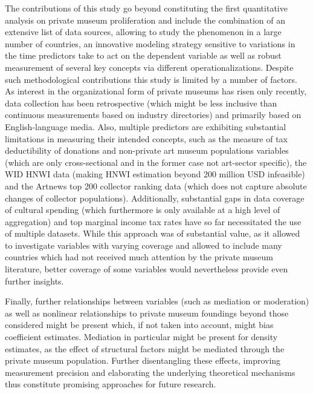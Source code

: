 \documentclass[11pt, authoryear]{elsarticle}
\begin{document}
The contributions of this study go beyond constituting the first quantitative analysis on private museum proliferation and include the combination of an extensive list of data sources, allowing to study the phenomenon in a large number of countries, an innovative modeling strategy sensitive to variations in the time predictors take to act on the dependent variable as well as robust measurement of several key concepts via different operationalizations.
Despite such methodological contributions this study is limited by a number of factors. 
As interest in the organizational form of private museums has risen only recently, data collection has been retrospective (which might be less inclusive than continuous measurements based on industry directories) and primarily based on English-language media.
Also, multiple predictors are exhibiting substantial limitations in measuring their intended concepts, such as the measure of tax deductibility of donations and non-private art museum populations variables (which are only cross-sectional and in the former case not art-sector specific), the WID HNWI data (making HNWI estimation beyond 200 million USD infeasible) and the Artnews top 200 collector ranking data (which does not capture absolute changes of collector populations).
Additionally, substantial gaps in data coverage of cultural spending (which furthermore is only available at a high level of aggregation) and top marginal income tax rates have so far necessitated the use of multiple datasets.
While this approach was of substantial value, as it allowed to investigate variables with varying coverage and  allowed to include many countries which had not received much attention by the private museum literature, better coverage of some variables would nevertheless provide even further insights.


Finally, further relationships between variables (such as mediation or moderation) as well as nonlinear relationships to private museum foundings beyond those considered might be present which, if not taken into account, might bias coefficient estimates.
Mediation in particular might be present for density estimates, as the effect of structural factors might be mediated through the private museum population.
Further disentangling these effects, improving measurement precision and elaborating the underlying theoretical mechanisms thus constitute promising approaches for future research. 





\clearpage
\FloatBarrier
\end{document}
